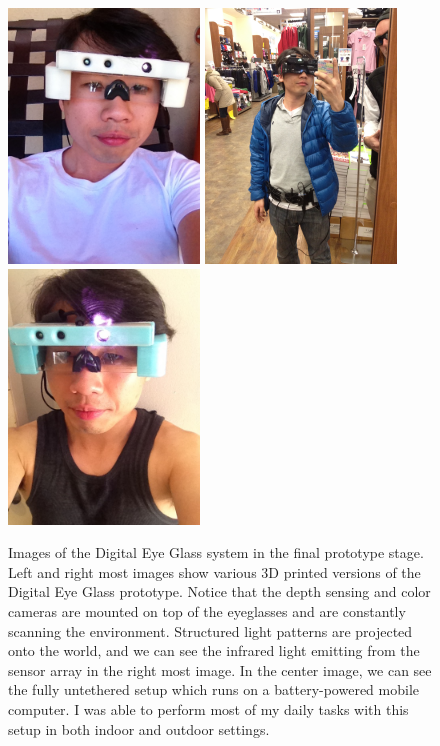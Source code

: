 \begin{figure}
\center
\includegraphics[width=2in]{ch7/figures/left_white.jpg}
\includegraphics[width=2in]{ch7/figures/wearable.jpg}
\includegraphics[width=2in]{ch7/figures/right_blue.jpg}

 \caption{Images of the Digital Eye Glass system in the final prototype stage. Left and right most images show various 3D printed versions of the Digital Eye Glass prototype. Notice that the depth sensing and color cameras are mounted on top of the eyeglasses and are constantly scanning the environment. Structured light patterns are projected onto the world, and we can see the infrared light emitting from the sensor array in the right most image. In the center image, we can see the fully untethered setup which runs on a battery-powered mobile computer. I was able to perform most of my daily tasks with this setup in both indoor and outdoor settings.}
 \label{fig:prototypes}
\end{figure}



